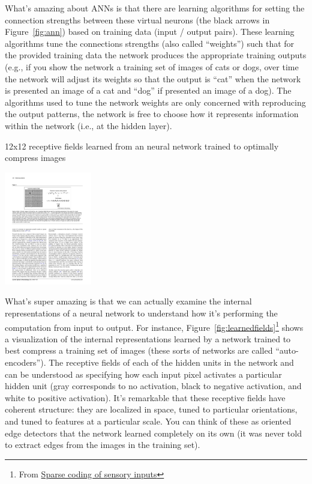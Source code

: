 \documentclass[assignment01_Solutions]{subfiles}
\begin{document}
What's amazing about ANNs is that there are learning algorithms for setting the connection strengths between these virtual neurons (the black arrows in Figure~\ref{fig:ann}) based on training data (input / output pairs).  These learning algorithms tune the connections strengths (also called ``weights'') such that for the provided training data the network produces the appropriate training outputs (e.g., if you show the network a training set of images of cats or dogs, over time the network will adjust its weights so that the output is ``cat'' when the network is presented an image of a cat and ``dog'' if presented an image of a dog).  The algorithms used to tune the network weights are only concerned with reproducing the output patterns, the network is free to choose how it represents information within the network (i.e., at the hidden layer).

\begin{marginfigure}

\caption{12x12 receptive fields learned from an neural network trained to optimally compress images}
\includegraphics[width=1.5in]{figures/learned_receptive_fields}\label{fig:learnedfields}
\end{marginfigure}
What's super amazing is that we can actually examine the internal representations of a neural network to understand how it's performing the computation from input to output. For instance, Figure~\ref{fig:learnedfields}\footnote{From \href{http://www.cnbc.cmu.edu/~tai/nc19journalclubs/Olshausen-Field-CON-2004-1.pdf}{Sparse coding of sensory inputs}} shows a visualization of the internal representations learned by a network trained to best compress a training set of images (these sorts of networks are called ``auto-encoders'').  The receptive fields of each of the hidden units in the network and can be understood as specifying how each input pixel activates a particular hidden unit (gray corresponds to no activation, black to negative activation, and white to positive activation).  It's remarkable that these receptive fields have coherent structure: they are localized in space, tuned to particular orientations, and tuned to features at a particular scale.  You can think of these as oriented edge detectors that the network learned completely on its own (it was never told to extract edges from the images in the training set).
\end{document}
